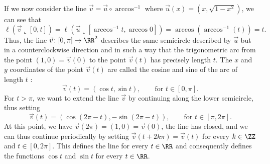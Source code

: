 If we now consider the line $\vec v = \vec u \circ \arccos^{-1}$ where $\vec
u(x)=(x,\sqrt{1-x^2})$, we can see that
\[
 \ell(\vec v\llcorner [0,t])  
 = \ell(\vec u\llcorner[\arccos^{-1} t,\arccos 0])
 = \arccos (\arccos^{-1} (t)) = t.
\]
Thus, the line $\vec v\colon[0,\pi]\to\RR^2$ describes the same semicircle
described by $\vec u$ but in a counterclockwise direction and in such a way that
the trigonometric arc from the point $(1,0)=\vec v(0)$ to the point $\vec v(t)$
has precisely length $t$. The $x$ and $y$ coordinates of the point $\vec v(t)$
are called the cosine and sine of the arc of length $t$%
:
\[
  \vec v(t) = (\cos t, \sin t), \qquad\text{for $t\in[0,\pi]$}.  
\]
For $t>\pi$, we want to extend the line $\vec v$ by continuing along the lower
semicircle, thus setting
\[
  \vec v(t) = (\cos (2\pi - t), -\sin (2\pi - t)), \qquad \text{for $t\in[\pi,2\pi]$}.  
\]
At this point, we have $\vec v(2 \pi) = (1,0) = \vec v(0)$, the line has closed,
and we can thus continue periodically by setting $\vec v(t+2 k \pi) = \vec v(t)$
for every $k\in \ZZ$ and $t\in[0,2\pi]$. This defines the line for every $t\in
\RR$ and consequently defines the functions $\cos t$ and $\sin t$ for every
$t\in \RR$.
